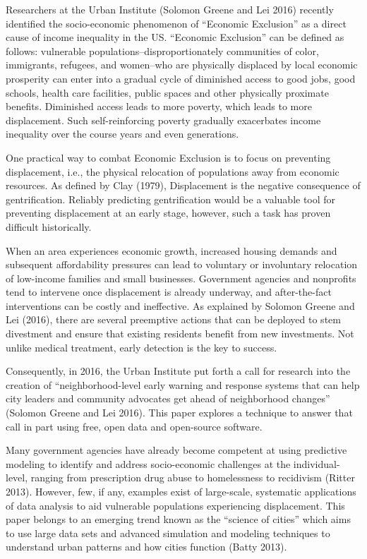 \documentclass[12pt,]{article}
\begin{document}
Researchers at the Urban Institute (Solomon Greene and Lei 2016)
recently identified the socio-economic phenomenon of ``Economic
Exclusion'' as a direct cause of income inequality in the US. ``Economic
Exclusion'' can be defined as follows: vulnerable
populations--disproportionately communities of color, immigrants,
refugees, and women--who are physically displaced by local economic
prosperity can enter into a gradual cycle of diminished access to good
jobs, good schools, health care facilities, public spaces and other
physically proximate benefits. Diminished access leads to more poverty,
which leads to more displacement. Such self-reinforcing poverty
gradually exacerbates income inequality over the course years and even
generations.

One practical way to combat Economic Exclusion is to focus on preventing
displacement, i.e., the physical relocation of populations away from
economic resources. As defined by Clay (1979), Displacement is the
negative consequence of gentrification. Reliably predicting
gentrification would be a valuable tool for preventing displacement at
an early stage, however, such a task has proven difficult historically.

When an area experiences economic growth, increased housing demands and
subsequent affordability pressures can lead to voluntary or involuntary
relocation of low-income families and small businesses. Government
agencies and nonprofits tend to intervene once displacement is already
underway, and after-the-fact interventions can be costly and
ineffective. As explained by Solomon Greene and Lei (2016), there are
several preemptive actions that can be deployed to stem divestment and
ensure that existing residents benefit from new investments. Not unlike
medical treatment, early detection is the key to success.

Consequently, in 2016, the Urban Institute put forth a call for research
into the creation of ``neighborhood-level early warning and response
systems that can help city leaders and community advocates get ahead of
neighborhood changes'' (Solomon Greene and Lei 2016). This paper
explores a technique to answer that call in part using free, open data
and open-source software.

Many government agencies have already become competent at using
predictive modeling to identify and address socio-economic challenges at
the individual-level, ranging from prescription drug abuse to
homelessness to recidivism (Ritter 2013). However, few, if any, examples
exist of large-scale, systematic applications of data analysis to aid
vulnerable populations experiencing displacement. This paper belongs to
an emerging trend known as the ``science of cities'' which aims to use
large data sets and advanced simulation and modeling techniques to
understand urban patterns and how cities function (Batty 2013).
\end{document}
